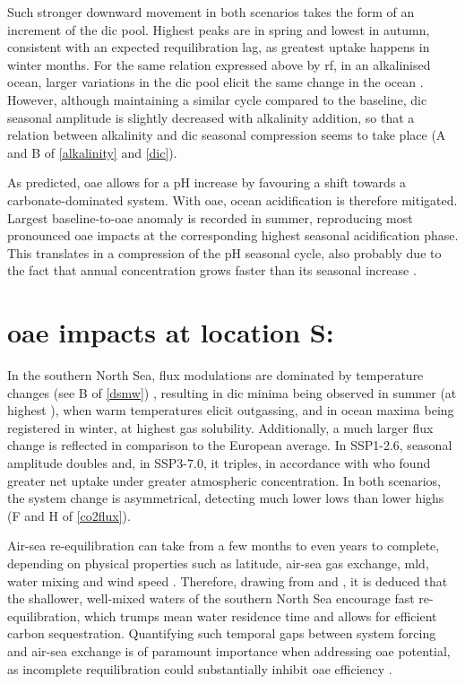 Such stronger  downward movement in both scenarios takes the form of an increment of the \ac{dic} pool. Highest peaks are in spring and lowest in autumn, consistent with an expected requilibration lag, as greatest uptake happens in winter months. For the same relation expressed above by \ac{rf}, in an alkalinised ocean, larger variations in the \ac{dic} pool elicit the same change in the ocean . However, although maintaining a similar cycle compared to the baseline, \ac{dic} seasonal amplitude is slightly decreased with alkalinity addition, so that a relation between alkalinity and \ac{dic} seasonal compression seems to take place (A and B of \cref{alkalinity} and \cref{dic}).  

As predicted, \ac{oae} allows for a pH increase by favouring a shift towards a carbonate-dominated system. With \ac{oae}, ocean acidification is therefore mitigated. Largest baseline-to-\ac{oae} anomaly is recorded in summer, reproducing most pronounced \ac{oae} impacts at the corresponding highest seasonal acidification phase. This translates in a compression of the pH seasonal cycle, also probably due to the fact that  annual concentration grows faster than its seasonal increase \citep{kwiatkowski2022modified, kwiatkowski2018diverging}.

\section[\texorpdfstring{OAE}{OAE} impacts at location S:]{\ac{oae} impacts at location S:}

In the southern North Sea,  flux modulations are dominated by temperature changes (see B of \cref{dsmw}) \citep{rodgers2023seasonal, salt2013variability, prowe2009mechanisms}, resulting in \ac{dic} minima being observed in summer (at highest ), when warm temperatures elicit outgassing, and in ocean  maxima being registered in winter, at highest gas solubility. Additionally, a much larger flux change is reflected in comparison to the European average. In SSP1-2.6,  seasonal amplitude doubles and, in SSP3-7.0, it triples, in accordance with \cite{lenton2018assessing} who found greater net uptake under greater atmospheric  concentration. In both scenarios, the system change is asymmetrical, detecting much lower lows than lower highs (F and H of \cref{co2flux}). 

Air-sea re-equilibration can take from a few months to even years to complete, depending on physical properties such as latitude, air-sea gas exchange, \ac{mld}, water mixing and wind speed \citep{jones2014spatial}. Therefore, drawing from \cite{wang2023simulated} and \cite{jones2014spatial}, it is deduced that the shallower, well-mixed waters of the southern North Sea encourage fast re-equilibration, which trumps mean water residence time and allows for efficient carbon sequestration. Quantifying such temporal gaps between system forcing and air-sea exchange is of paramount importance when addressing \ac{oae} potential, as incomplete requilibration could substantially inhibit \ac{oae} efficiency \citep{wang2023simulated, jones2014spatial}. 

